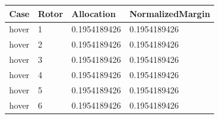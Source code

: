 \begin{tabular}{@{}llll@{}}
\toprule
Case & Rotor & Allocation & NormalizedMargin \\
\midrule
hover & 1 & 0.1954189426 & 0.1954189426 \\
hover & 2 & 0.1954189426 & 0.1954189426 \\
hover & 3 & 0.1954189426 & 0.1954189426 \\
hover & 4 & 0.1954189426 & 0.1954189426 \\
hover & 5 & 0.1954189426 & 0.1954189426 \\
hover & 6 & 0.1954189426 & 0.1954189426 \\
\bottomrule
\end{tabular}
